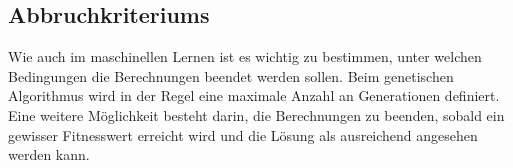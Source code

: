 %
%
%
%
\subsection{Abbruchkriteriums
\label{buch:paper:varalg:subsection:termination}}
Wie auch im maschinellen Lernen ist es wichtig zu bestimmen, unter 
welchen Bedingungen die Berechnungen beendet werden sollen. Beim 
genetischen Algorithmus wird in der Regel eine maximale Anzahl an 
Generationen definiert. Eine weitere Möglichkeit besteht darin, 
die Berechnungen zu beenden, sobald ein gewisser Fitnesswert erreicht 
wird und die Lösung als ausreichend angesehen werden kann.
